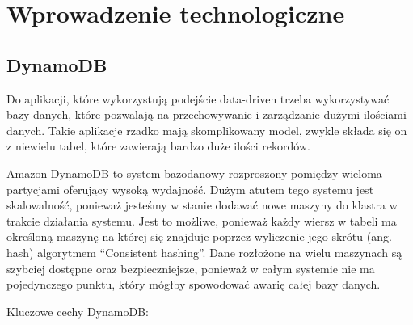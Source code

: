\chapter{Wprowadzenie technologiczne}
\label{cha:wprowadzenieTechnologiczne}


\section{DynamoDB}
\label{sec:dynamoDb}


Do aplikacji, które wykorzystują podejście data-driven trzeba wykorzystywać bazy danych, które pozwalają na przechowywanie i zarządzanie dużymi ilościami danych. Takie aplikacje rzadko mają skomplikowany model, zwykle składa się on z niewielu tabel, które zawierają bardzo duże ilości rekordów.

Amazon DynamoDB to system bazodanowy rozproszony pomiędzy wieloma partycjami oferujący wysoką wydajność. Dużym atutem tego systemu jest skalowalność, ponieważ jesteśmy w stanie dodawać nowe maszyny do klastra w trakcie działania systemu. Jest to możliwe, ponieważ każdy wiersz w tabeli ma określoną maszynę na której się znajduje poprzez wyliczenie jego skrótu (ang. hash) algorytmem “Consistent hashing”.  Dane rozłożone na wielu maszynach są szybciej dostępne oraz bezpieczniejsze, ponieważ w całym systemie nie ma pojedynczego punktu, który mógłby spowodować awarię całej bazy danych.


Kluczowe cechy DynamoDB:


